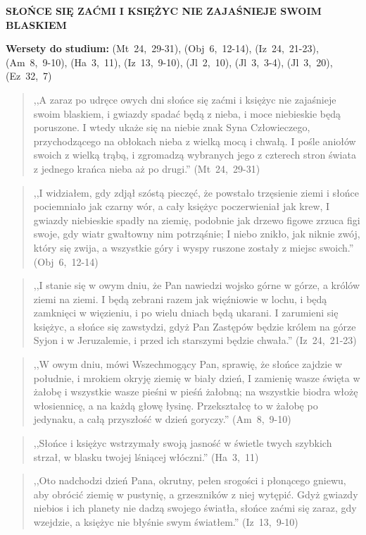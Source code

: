 \documentclass[10pt,a4paper,oneside]{article}
\begin{document}
\centerline{\textbf{\MakeUppercase{Słońce się zaćmi i księżyc nie zajaśnieje swoim blaskiem}}}
\begin{center}
\textbf{Wersety do studium:} (Mt~24,~29-31), (Obj~6,~12-14), (Iz~24,~21-23), (Am~8,~9-10), (Ha~3,~11), (Iz~13,~9-10), (Jl~2,~10), (Jl~3,~3-4), (Jl~3,~20), (Ez~32,~7)
\end{center}
\begin{quote}
,,A zaraz po udręce owych dni słońce się zaćmi i księżyc nie zajaśnieje swoim blaskiem, i gwiazdy spadać będą z nieba, i moce niebieskie będą poruszone. I wtedy ukaże się na niebie znak Syna Człowieczego, przychodzącego na obłokach nieba z wielką mocą i chwałą. I pośle aniołów swoich z wielką trąbą, i zgromadzą wybranych jego z czterech stron świata z jednego krańca nieba aż po drugi.'' (Mt~24,~29-31)
\end{quote}
\begin{quote}
,,I widziałem, gdy zdjął szóstą pieczęć, że powstało trzęsienie ziemi i słońce pociemniało jak czarny wór, a cały księżyc poczerwieniał jak krew, I gwiazdy niebieskie spadły na ziemię, podobnie jak drzewo figowe zrzuca figi swoje, gdy wiatr gwałtowny nim potrząśnie; I niebo znikło, jak niknie zwój, który się zwija, a wszystkie góry i wyspy ruszone zostały z miejsc swoich.'' (Obj~6,~12-14)
\end{quote}
\begin{quote}
,,I stanie się w owym dniu, że Pan nawiedzi wojsko górne w górze, a królów ziemi na ziemi. I będą zebrani razem jak więźniowie w lochu, i będą zamknięci w więzieniu, i po wielu dniach będą ukarani. I zarumieni się księżyc, a słońce się zawstydzi, gdyż Pan Zastępów będzie królem na górze Syjon i w Jeruzalemie, i przed ich starszymi będzie chwała.'' (Iz~24,~21-23)
\end{quote}
\begin{quote}
,,W owym dniu, mówi Wszechmogący Pan, sprawię, że słońce zajdzie w południe, i mrokiem okryję ziemię w biały dzień, I zamienię wasze święta w żałobę i wszystkie wasze pieśni w pieśń żałobną; na wszystkie biodra włożę włosiennicę, a na każdą głowę łysinę. Przekształcę to w żałobę po jedynaku, a całą przyszłość w dzień goryczy.'' (Am~8,~9-10)
\end{quote}
\begin{quote}
,,Słońce i księżyc wstrzymały swoją jasność w świetle twych szybkich strzał, w blasku twojej lśniącej włóczni.'' (Ha~3,~11)
\end{quote}
\begin{quote}
,,Oto nadchodzi dzień Pana, okrutny, pełen srogości i płonącego gniewu, aby obrócić ziemię w pustynię, a grzeszników z niej wytępić. Gdyż gwiazdy niebios i ich planety nie dadzą swojego światła, słońce zaćmi się zaraz, gdy wzejdzie, a księżyc nie błyśnie swym światłem.'' (Iz~13,~9-10)
\end{quote}
\end{document}
